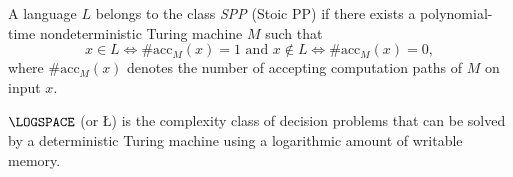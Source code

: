 \begin{definition}\label{def:SPP}
    A language $L$ belongs to the class \emph{\textsf{SPP}} (Stoic PP) if there exists a polynomial-time nondeterministic Turing machine $M$ such that
    \[
    x\in L \iff \#\mathrm{acc}_M(x)=1  \text{ and }  x\notin L \iff \#\mathrm{acc}_M(x)=0,
    \]
    where $\#\mathrm{acc}_M(x)$ denotes the number of accepting computation paths
    of $M$ on input $x$.
    \end{definition}


\vspace{1em}

\begin{definition}\label{def: logspace}
$\LOGSPACE$ (or \L) is the complexity class of decision problems that can be solved by a deterministic Turing machine using a logarithmic amount of writable memory.
\end{definition}


\vspace{1em}

